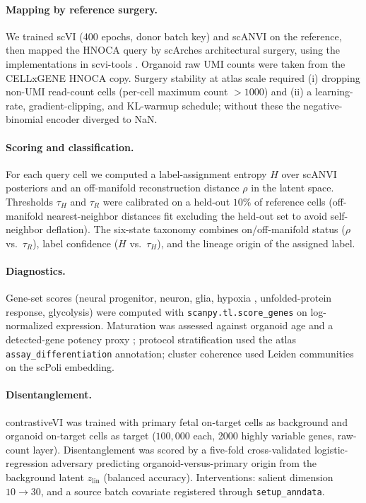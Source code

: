 \documentclass[11pt]{article}
\newcommand{\zlin}{\ensuremath{z_{\mathrm{lin}}}}
\newcommand{\tauH}{\ensuremath{\tau_{H}}}
\newcommand{\tauR}{\ensuremath{\tau_{R}}}
\begin{document}
\paragraph{Mapping by reference surgery.} We trained scVI (400 epochs, donor batch key) and scANVI on
the reference, then mapped the HNOCA query \citep{he2024hnoca} by scArches architectural surgery,
using the implementations in scvi-tools \citep{lopez2018scvi,xu2021scanvi,lotfollahi2022scarches,gayoso2022scvitools}.
Organoid raw UMI counts were taken from the CELLxGENE HNOCA copy. Surgery stability at atlas scale
required (i) dropping non-UMI read-count cells (per-cell maximum count $>1000$) and (ii) a learning-rate,
gradient-clipping, and KL-warmup schedule; without these the negative-binomial encoder diverged to
NaN.

\paragraph{Scoring and classification.} For each query cell we computed a label-assignment entropy
$H$ over scANVI posteriors and an off-manifold reconstruction distance $\rho$ in the latent space.
Thresholds \tauH{} and \tauR{} were calibrated on a held-out $10\%$ of reference cells (off-manifold
nearest-neighbor distances fit excluding the held-out set to avoid self-neighbor deflation). The
six-state taxonomy combines on/off-manifold status ($\rho$ vs.\ \tauR), label confidence ($H$ vs.\
\tauH), and the lineage origin of the assigned label.

\paragraph{Diagnostics.} Gene-set scores (neural progenitor, neuron, glia, hypoxia
\citep{buffa2010hypoxia}, unfolded-protein response, glycolysis) were computed with
\texttt{scanpy.tl.score\_genes} on log-normalized expression. Maturation was assessed against organoid
age and a detected-gene potency proxy \citep{gulati2020cytotrace}; protocol stratification used the
atlas \texttt{assay\_differentiation} annotation; cluster coherence used Leiden communities
\citep{traag2019leiden} on the scPoli embedding.

\paragraph{Disentanglement.} contrastiveVI \citep{weinberger2023contrastivevi} was trained with primary
fetal on-target cells as background and organoid on-target cells as target ($100{,}000$ each, 2000
highly variable genes, raw-count layer). Disentanglement was scored by a five-fold cross-validated
logistic-regression adversary predicting organoid-versus-primary origin from the background latent
\zlin{} (balanced accuracy). Interventions: salient dimension $10\!\rightarrow\!30$, and a source
batch covariate registered through \texttt{setup\_anndata}.
\end{document}
